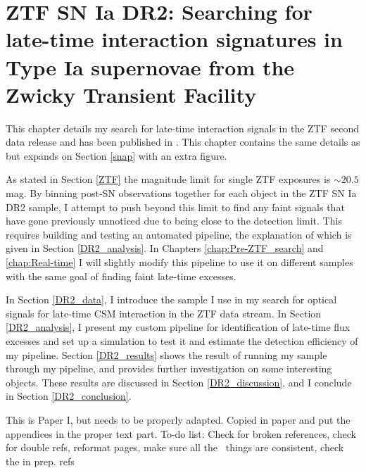 \documentclass[a4paper,oneside,12pt, class=Latex/Classes/PhDthesisPSnPDF, crop=false]{standalone}
\begin{document}
\doublespacing
\chapter{ZTF SN Ia DR2: Searching for late-time interaction signatures in Type Ia supernovae from the Zwicky Transient Facility}
\label{chap:DR2_search}
This chapter details my search for late-time interaction signals in the ZTF second data release \citep[ZTF SN Ia DR2,][Smith et al. in prep.]{DR2_Overview} and has been published in \citet{Terwel_2024_paper1}. This chapter contains the same details as \citet{Terwel_2024_paper1} but expands on Section \ref{snap} with an extra figure.

As stated in Section \ref{ZTF} the magnitude limit for single ZTF exposures is $\sim20.5$ mag. By binning post-SN observations together for each object in the ZTF SN Ia DR2 sample, I attempt to push beyond this limit to find any faint signals that have gone previously unnoticed due to being close to the detection limit. This requires building and testing an automated pipeline, the explanation of which is given in Section \ref{DR2_analysis}. In Chapters \ref{chap:Pre-ZTF_search} and \ref{chap:Real-time} I will slightly modify this pipeline to use it on different samples with the same goal of finding faint late-time excesses.

In Section \ref{DR2_data}, I introduce the sample I use in my search for optical signals for late-time CSM interaction in the ZTF data stream. In Section \ref{DR2_analysis}, I present my custom pipeline for identification of late-time flux excesses and set up a simulation to test it and estimate the detection efficiency of my pipeline. Section \ref{DR2_results} shows the result of running my sample through my pipeline, and provides further investigation on some interesting objects. These results are discussed in Section \ref{DR2_discussion}, and I conclude in Section \ref{DR2_conclusion}.

\color{red} This is Paper I, but needs to be properly adapted. Copied in paper and put the appendices in the proper text part. To-do list: Check for broken references, check for double refs, reformat pages, make sure all the \ztfg\ztfr\ztfi\ things are consistent, check the in prep. refs\color{black}
\end{document}
